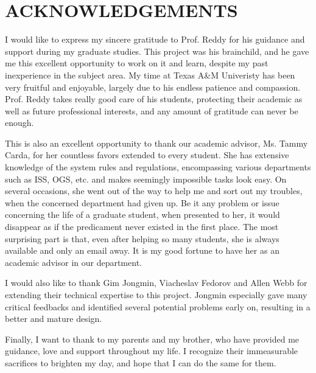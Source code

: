 %
%
%


\chapter*{ACKNOWLEDGEMENTS}


\indent 

I would like to express my sincere gratitude to Prof. Reddy for his guidance and support during my graduate studies. 
This project was his brainchild, and he gave me this excellent opportunity to work on it and learn, despite my past inexperience in the subject area. 
My time at Texas A\&M Univeristy has been very fruitful and enjoyable, largely due to his endless patience and compassion.
Prof. Reddy takes really good care of his students, protecting their academic as well as future professional interests, and any amount of gratitude can never be enough. 

This is also an excellent opportunity to thank our academic advisor, Ms. Tammy Carda, for her countless favors extended to every student.
She has extensive knowledge of the system rules and regulations, encompassing various departments such as ISS, OGS, etc. and makes seemingly impossible tasks look easy.
On several occasions, she went out of the way to help me and sort out my troubles, when the concerned department had given up.
Be it any problem or issue concerning the life of a graduate student, when presented to her, it would disappear as if the predicament never existed in the first place.
The most surprising part is that, even after helping so many students, she is always available and only an email away.
It is my good fortune to have her as an academic advisor in our department.

I would also like to thank Gim Jongmin, Viacheslav Fedorov and Allen Webb for extending their technical expertise to this project. Jongmin especially gave many critical feedbacks and identified several potential problems early on, resulting in a better and mature design. 

Finally, I want to thank to my parents and my brother, who have provided me guidance, love and support throughout my life. I recognize their immeasurable sacrifices to brighten my day, and hope that I can do the same for them.

\pagebreak{}
